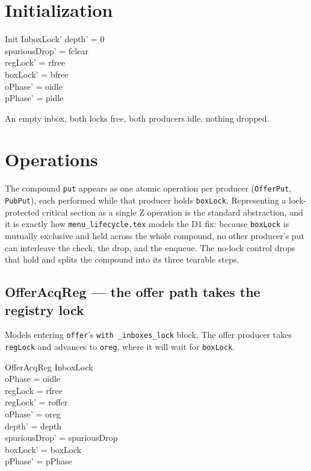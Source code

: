 \documentclass[a4paper,10pt,fleqn]{article}
\begin{document}
\section{Initialization}

\begin{schema}{Init}
  InboxLock'
\where
  depth' = 0 \\
  spuriousDrop' = fclear \\
  regLock' = rfree \\
  boxLock' = bfree \\
  oPhase' = oidle \\
  pPhase' = pidle
\end{schema}

An empty inbox, both locks free, both producers idle, nothing dropped.

\section{Operations}

The compound \texttt{put} appears as one atomic operation per producer
(\texttt{OfferPut}, \texttt{PubPut}), each performed while that producer holds
\texttt{boxLock}. Representing a lock-protected critical section as a single Z
operation is the standard abstraction, and it is exactly how
\texttt{menu\_lifecycle.tex} models the D1 fix: because \texttt{boxLock} is
mutually exclusive and held across the whole compound, no other producer's put
can interleave the check, the drop, and the enqueue. The no-lock control drops
that hold and splits the compound into its three tearable steps.

\subsection{OfferAcqReg --- the offer path takes the registry lock}

Models entering \texttt{offer}'s \texttt{with \_inboxes\_lock} block. The offer
producer takes \texttt{regLock} and advances to \texttt{oreg}, where it will wait
for \texttt{boxLock}.

\begin{schema}{OfferAcqReg}
  \Delta InboxLock \\
\where
  oPhase = oidle \\
  regLock = rfree \\
  regLock' = roffer \\
  oPhase' = oreg \\
  depth' = depth \\
  spuriousDrop' = spuriousDrop \\
  boxLock' = boxLock \\
  pPhase' = pPhase
\end{schema}
\end{document}
